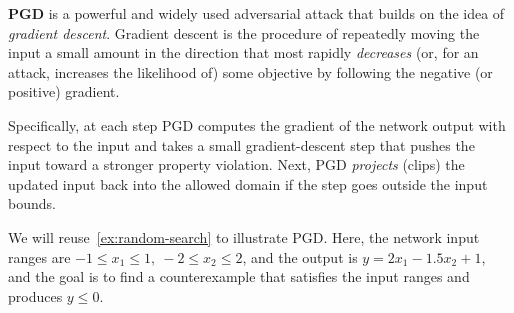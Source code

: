 \documentclass[oneside,11pt,dvipsnames]{book}
\numberwithin{equation}{section}
\theoremstyle{definition}
\theoremstyle{remark}
\begin{document}
\textbf{PGD} is a powerful and widely used adversarial attack that builds on the idea of \emph{gradient descent}.
Gradient descent is the procedure of repeatedly moving the input a small amount in the direction that most rapidly \emph{decreases} (or, for an attack, increases the likelihood of) some objective by following the negative (or positive) gradient.

Specifically, at each step PGD computes the gradient of the network output with respect to the input and takes a small gradient-descent step that pushes the input toward a stronger property violation. Next, PGD \emph{projects} (clips) the updated input back into the allowed domain if the step goes outside the input bounds.

We will reuse~\autoref{ex:random-search} to illustrate PGD. Here,  the network input ranges are $-1 \leq x_1 \leq 1,~-2 \leq x_2 \leq 2$, and the output is $y = 2x_1 - 1.5x_2 + 1$, and the goal is to find a counterexample that satisfies the input ranges and produces $y \leq 0$.
\end{document}
